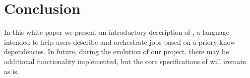 \section{Conclusion}
\label{sect:conc}
In this white paper we present an introductory description of \lang, a language
intended to help users describe and orchestrate jobs based on a-priory know dependencies.
In future, during the evolution of our project, there may be additional functionality
implemented, but the core specifications of \lang will iremain as is.
